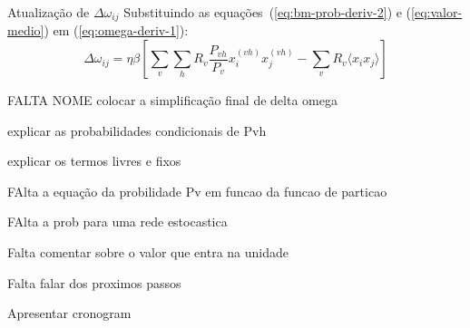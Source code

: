 \begin{frame}{Atualização de $\Delta \omega_{ij}$}%
  \justifying%
  Substituindo as equações~(\ref{eq:bm-prob-deriv-2}) e (\ref{eq:valor-medio}) em (\ref{eq:omega-deriv-1}):
  \begin{equation}%
    \label{eq:omega-deriv-2}%
    \Delta \omega_{ij} = \eta \beta \left[ \sum_{v} \sum_{h} R_{v} \frac{P_{vh}}{P_{v}} x^{(vh)}_{i} x^{(vh)}_{j} - \sum_{v} R_{v} \langle x_{i} x_{j} \rangle \right]
  \end{equation}
\end{frame}

\begin{frame}{FALTA NOME}
colocar a simplificação final de delta omega

explicar as probabilidades condicionais de Pvh

explicar os termos livres e fixos

FAlta a equação da probilidade Pv em funcao da funcao de particao

FAlta a prob para uma rede estocastica

Falta comentar sobre o valor que entra na unidade

Falta falar dos proximos passos

Apresentar cronogram

\end{frame}

